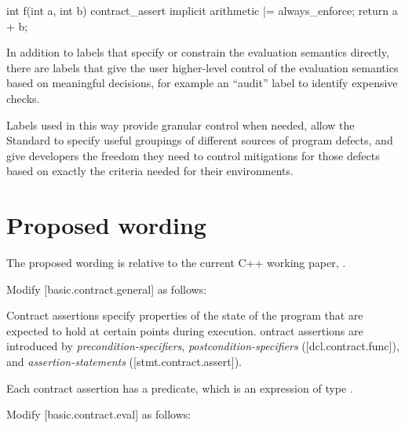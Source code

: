 \begin{codeblock}
int f(int a, int b) {
  contract_assert implicit arithmetic |= always_enforce;
  return a + b;
}
\end{codeblock}

In addition to labels that specify or constrain the evaluation semantics directly, there are labels that give the user higher-level control of the evaluation semantics based on meaningful decisions, for example an ``audit'' label to identify expensive checks.

Labels used in this way provide granular control when needed, allow the Standard to
specify useful groupings of different sources of program defects, and give developers the freedom they
need to control mitigations for those defects based on exactly the criteria needed for their environments.

\section{Proposed wording}
\label{wording}

The proposed wording is relative to the current C++ working paper, \cite{N5008}.

Modify [basic.contract.general] as follows:

\begin{adjustwidth}{0.5cm}{0.5cm}
Contract assertions specify properties of the state of the program
that are expected to hold at certain points during execution. ontract assertions
are introduced by \emph{precondition-specifiers}, \emph{postcondition-specifiers} ([dcl.contract.func]),
and \emph{assertion-statements} ([stmt.contract.assert]). 

Each contract assertion has a predicate, which is an expression of type . 
\begin{note}
\end{note}
\end{adjustwidth}

Modify [basic.contract.eval] as follows:

